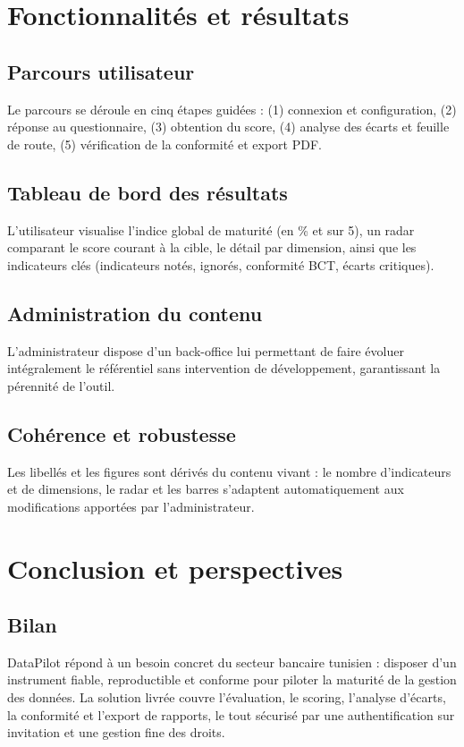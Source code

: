\documentclass[11pt,a4paper]{report}
\begin{document}
\chapter{Fonctionnalités et résultats}

\section{Parcours utilisateur}
Le parcours se déroule en cinq étapes guidées : (1) connexion et configuration,
(2) réponse au questionnaire, (3) obtention du score, (4) analyse des écarts et
feuille de route, (5) vérification de la conformité et export PDF.

\section{Tableau de bord des résultats}
L'utilisateur visualise l'indice global de maturité (en \% et sur 5), un radar
comparant le score courant à la cible, le détail par dimension, ainsi que les
indicateurs clés (indicateurs notés, ignorés, conformité BCT, écarts critiques).

\section{Administration du contenu}
L'administrateur dispose d'un back-office lui permettant de faire évoluer
intégralement le référentiel sans intervention de développement, garantissant la
pérennité de l'outil.

\section{Cohérence et robustesse}
Les libellés et les figures sont dérivés du contenu vivant : le nombre
d'indicateurs et de dimensions, le radar et les barres s'adaptent automatiquement
aux modifications apportées par l'administrateur.

\chapter{Conclusion et perspectives}

\section{Bilan}
DataPilot répond à un besoin concret du secteur bancaire tunisien : disposer d'un
instrument fiable, reproductible et conforme pour piloter la maturité de la
gestion des données. La solution livrée couvre l'évaluation, le scoring, l'analyse
d'écarts, la conformité et l'export de rapports, le tout sécurisé par une
authentification sur invitation et une gestion fine des droits.
\end{document}
